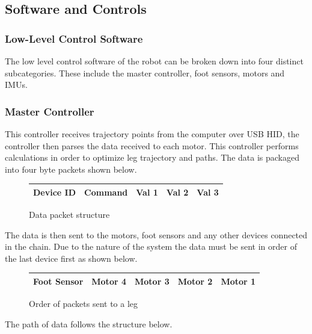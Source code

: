 \subsection{Software and Controls}

\subsubsection{Low-Level Control Software} 
The low level control software of the robot can be broken down into four distinct subcategories. These include the master controller, foot sensors, motors and IMUs. 
    \subsubsection{Master Controller}
    This controller receives trajectory points from the computer over USB HID, the controller then parses the data received to each motor. This controller performs calculations in order to optimize leg trajectory and paths. The data is packaged into four byte packets shown below.  
    \begin{figure}[H]
    \centering
    \begin{tabular}{|c|c|c|c|c|}
    \hline
     Device ID& Command & Val 1 & Val 2 & Val 3\\
    \hline
    \end{tabular}
    \caption{Data packet structure}
    \label{fig:my_label}
\end{figure}
The data is then sent to the motors, foot sensors and any other devices connected in the chain. Due to the nature of the system the data must be sent in order of the last device first as shown below. 
\begin{figure}[H]
    \centering
    \begin{tabular}{|c|c|c|c|c|}
    \hline
        Foot Sensor & Motor 4 & Motor 3 & Motor 2 & Motor 1  \\
        \hline
    \end{tabular}
    \caption{Order of packets sent to a leg}
    \label{fig:my_label}
\end{figure}
The path of data follows the structure below.

